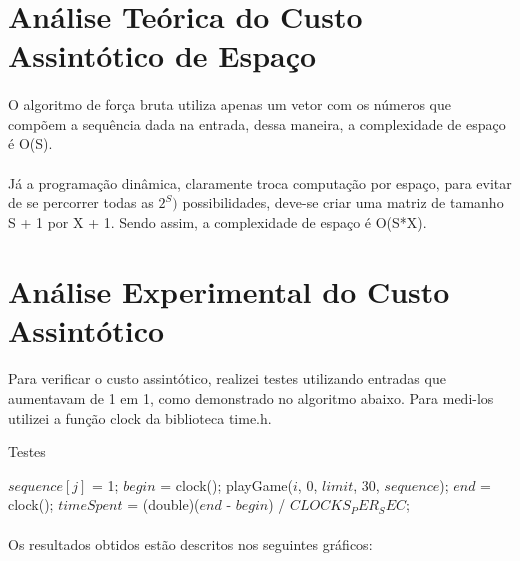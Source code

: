\documentclass[a4paper, 12pt]{article}
\begin{document}
\section{Análise Teórica do Custo Assintótico de Espaço}
\paragraph{}
O algoritmo de força bruta utiliza apenas um vetor com os números que compõem a sequência dada na entrada, dessa maneira, a complexidade de espaço é O(S).
\paragraph{}
Já a programação dinâmica, claramente troca computação por espaço, para evitar de se percorrer todas as {\(2^S)\)} possibilidades, deve-se criar uma matriz de tamanho S + 1 por X + 1. Sendo assim, a complexidade de espaço é O(S*X).


\section{Análise Experimental do Custo Assintótico}
\paragraph{}
Para verificar o custo assintótico, realizei testes utilizando entradas que aumentavam de 1 em 1, como demonstrado no algoritmo abaixo. Para medi-los utilizei a função clock da biblioteca time.h.
\begin{algorithm}
\caption{Testes}
\begin{algorithmic}
		    \State $sequence[j]$ = 1;
    	\EndFor
    	\State $begin$ = clock();
        \State playGame($i$, $0$, $limit$, $30$, $sequence$);
        \State $end$ = clock();
        \State $timeSpent$ = (double)($end$ - $begin$) / $CLOCKS_PER_SEC$;
    \EndFor
\EndFunction
\end{algorithmic}
\end{algorithm}

\paragraph{}
Os resultados obtidos estão descritos nos seguintes gráficos:
\end{document}
